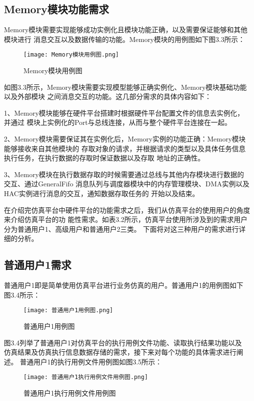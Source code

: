 \subsection{Memory模块功能需求}
Memory模块需要实现能够成功实例化且模块功能正确，以及需要保证能够和其他模块进行
消息交互以及数据传输的功能。Memory模块的用例图如下图3.3所示：

\begin{figure}[h]
    \centering
    \texttt{[image: Memory模块用例图.png]}
    \caption{Memory模块用例图}
    \label{fig:badge}
\end{figure}

如图3.3所示，Memory模块需要实现模型能够正确实例化、Memory模块基础功能以及外部模块
之间消息交互的功能。这几部分需求的具体内容如下：

1、Memory模块能够在硬件平台搭建时根据硬件平台配置文件的信息去实例化，并通过
模块上实例化的Port与总线连接，从而与整个硬件平台连接在一起。

2、Memory模块需要保证其在实例化后，Memory实例的功能正确：Memory模块能够接收来自其他模块的
存取对象的请求，并根据请求的类型以及具体任务信息执行任务，在执行数据的存取时保证数据以及存取
地址的正确性。

3、Memory模块在执行数据存取的时候需要通过总线与其他内存模块进行数据的交互、通过GeneralFifo
消息队列与调度器模块中的内存管理模块、DMA实例以及HAC实例进行消息的交互，通知数据存取任务的
开始以及结束。

在介绍完仿真平台中硬件平台的功能需求之后，我们从仿真平台的使用用户的角度来介绍仿真平台的功
能性需求。如表3.2所示，仿真平台使用所涉及到的需求用户分为普通用户1、高级用户和普通用户2三类。
下面将对这三种用户的需求进行详细的分析。

\subsection{普通用户1需求}
普通用户1即是简单使用仿真平台进行业务仿真的用户。普通用户1的用例图如下
图3.4所示：

\begin{figure}[h]
    \centering
    \texttt{[image: 普通用户1用例图.png]}
    \caption{普通用户1用例图}
    \label{fig:badge}
\end{figure}

图3.4列举了普通用户1对仿真平台的执行用例文件功能、读取执行结果功能以及
仿真结果及仿真执行信息数据存储的需求，接下来对每个功能的具体需求进行阐述。
普通用户1的执行用例文件用例图如图3.5所示：

\begin{figure}[h]
    \centering
    \texttt{[image: 普通用户1执行用例文件用例图.png]}
    \caption{普通用户1执行用例文件用例图}
    \label{fig:badge}
\end{figure}

